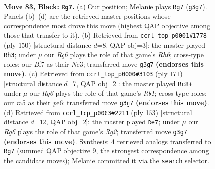 \documentclass[11pt]{article}
\begin{document}
\clearpage

\begin{figure}[p]\centering
\begin{subfigure}{0.46\textwidth}\centering
\resizebox{\linewidth}{!}{%
\newchessgame
\chessboard[
  setfen={1R6/3k1b2/8/R7/1P1K4/6r1/8/8 b - - 40 83},
  showmover=false,
  pgfstyle=straightmove, color=movearrow, markmove={g3-g7}
]}
\caption{}
\end{subfigure}\hfill
\begin{subfigure}{0.46\textwidth}\centering
\resizebox{\linewidth}{!}{%
\newchessgame
\chessboard[
  setfen={8/1k6/7R/p7/8/2N5/5K2/r7 w - - 0 76},
  showmover=false,
  pgfstyle=straightmove, color=movearrow, markmove={h6-h3}
]}
\caption{}
\end{subfigure}
\\[4pt]
\begin{subfigure}{0.46\textwidth}\centering
\resizebox{\linewidth}{!}{%
\newchessgame
\chessboard[
  setfen={1r6/4b2k/4P3/P7/2K5/8/8/R7 b - - 0 86},
  showmover=false,
  pgfstyle=straightmove, color=movearrow, markmove={b8-c8}
]}
\caption{}
\end{subfigure}\hfill
\begin{subfigure}{0.46\textwidth}\centering
\resizebox{\linewidth}{!}{%
\newchessgame
\chessboard[
  setfen={4b3/6r1/1R6/5R2/2k1p3/4P3/5K2/8 b - - 0 77},
  showmover=false,
  pgfstyle=straightmove, color=movearrow, markmove={g7-e7}
]}
\caption{}
\end{subfigure}
\caption{\textbf{Move 83, Black: \texttt{Rg7}.} (a) Our position; Melanie plays \texttt{Rg7} (\texttt{g3g7}). Panels (b)--(d) are the retrieved master positions whose correspondence most drove this move (highest QAP objective among those that transfer to it). (b) Retrieved from \texttt{ccrl\_top\_p0001\#1778} (ply 150) [structural distance $d$=8, QAP obj=3]: the master played \texttt{Rh3}; under $\mu$ our \emph{Rg6} plays the role of that game's \emph{Rh6}; cross-type roles: our \emph{B}f7 as their \emph{N}c3; transferred move \texttt{g3g7} \textbf{(endorses this move)}. (c) Retrieved from \texttt{ccrl\_top\_p0000\#3103} (ply 171) [structural distance $d$=7, QAP obj=2]: the master played \texttt{Rc8+}; under $\mu$ our \emph{Rg6} plays the role of that game's \emph{Rb1}; cross-type roles: our \emph{r}a5 as their \emph{p}e6; transferred move \texttt{g3g7} \textbf{(endorses this move)}. (d) Retrieved from \texttt{ccrl\_top\_p0003\#2211} (ply 153) [structural distance $d$=12, QAP obj=2]: the master played \texttt{Re7}; under $\mu$ our \emph{Rg6} plays the role of that game's \emph{Rg2}; transferred move \texttt{g3g7} \textbf{(endorses this move)}. Synthesis: 4 retrieved analogs transferred to \texttt{Rg7} (summed QAP objective 9, the strongest correspondence among the candidate moves); Melanie committed it via the \texttt{search} selector.}
\label{fig:thought-m165}
\end{figure}
\end{document}
